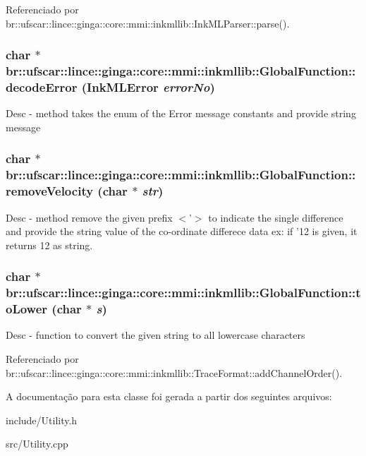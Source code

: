 Referenciado por br::ufscar::lince::ginga::core::mmi::inkmllib::InkMLParser::parse().

\subsubsection[{decodeError}]{\setlength{\rightskip}{0pt plus 5cm}char $\ast$ br::ufscar::lince::ginga::core::mmi::inkmllib::GlobalFunction::decodeError (InkMLError {\em errorNo})\hspace{0.3cm}{\ttfamily  [static]}}\label{classbr_1_1ufscar_1_1lince_1_1ginga_1_1core_1_1mmi_1_1inkmllib_1_1GlobalFunction_adc10afb654c4ae733b77b6aa672faf62}
Desc -\/ method takes the enum of the Error message constants and provide string message 
\subsubsection[{removeVelocity}]{\setlength{\rightskip}{0pt plus 5cm}char $\ast$ br::ufscar::lince::ginga::core::mmi::inkmllib::GlobalFunction::removeVelocity (char $\ast$ {\em str})\hspace{0.3cm}{\ttfamily  [static]}}\label{classbr_1_1ufscar_1_1lince_1_1ginga_1_1core_1_1mmi_1_1inkmllib_1_1GlobalFunction_a33dcee0d0375d1b708cb4ca89d010b73}
Desc -\/ method remove the given prefix $<$'$>$ to indicate the single difference and provide the string value of the co-\/ordinate differece data ex: if '12 is given, it returns 12 as string. 
\subsubsection[{toLower}]{\setlength{\rightskip}{0pt plus 5cm}char $\ast$ br::ufscar::lince::ginga::core::mmi::inkmllib::GlobalFunction::toLower (char $\ast$ {\em s})\hspace{0.3cm}{\ttfamily  [static]}}\label{classbr_1_1ufscar_1_1lince_1_1ginga_1_1core_1_1mmi_1_1inkmllib_1_1GlobalFunction_a2b1b6bff50fc4f53746650dd42cf2f45}
Desc -\/ function to convert the given string to all lowercase characters 

Referenciado por br::ufscar::lince::ginga::core::mmi::inkmllib::TraceFormat::addChannelOrder().



A documentação para esta classe foi gerada a partir dos seguintes arquivos:\begin{DoxyCompactItemize}
\item 
include/Utility.h\item 
src/Utility.cpp\end{DoxyCompactItemize}
